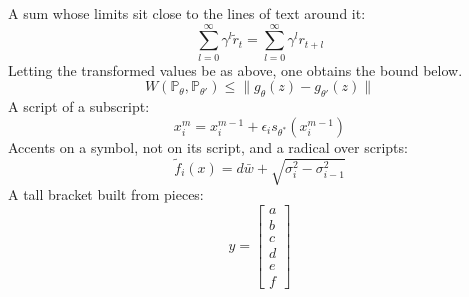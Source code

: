 \documentclass{article}
\begin{document}
A sum whose limits sit close to the lines of text around it:
\begin{equation}
\sum_{l=0}^{\infty} \gamma^l \tilde{r}_t = \sum_{l=0}^{\infty} \gamma^l r_{t+l}
\end{equation}
Letting the transformed values be as above, one obtains the bound below.
\[ W(\mathbb{P}_\theta, \mathbb{P}_{\theta'}) \le \|g_\theta(z) - g_{\theta'}(z)\| \]
A script of a subscript:
\[ x_i^m = x_i^{m-1} + \epsilon_i s_{\theta^*}(x_i^{m-1}) \]
Accents on a symbol, not on its script, and a radical over scripts:
\[ \tilde{f}_i(x) = d\bar{w} + \sqrt{\sigma_i^2 - \sigma_{i-1}^2} \]
A tall bracket built from pieces:
\[ y = \left[ \begin{matrix} a \\ b \\ c \\ d \\ e \\ f \end{matrix} \right] \]
\end{document}
